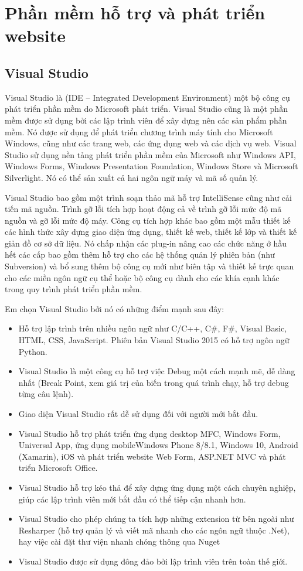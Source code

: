 \section{Phần mềm hỗ trợ và phát triển website}
\subsection{Visual Studio}
Visual Studio là (IDE – Integrated Development Environment) một bộ công cụ phát triển phần mềm do Microsoft phát triển. Visual Studio cũng là một phần mềm được sử dụng bởi các lập trình viên để xây dựng nên các sản phẩm phần mềm. Nó được sử dụng để phát triển chương trình máy tính cho Microsoft Windows, cũng như các trang web, các ứng dụng web và các dịch vụ web. Visual Studio sử dụng nền tảng phát triển phần mềm của Microsoft như Windows API, Windows Forms, Windows Presentation Foundation, Windows Store và Microsoft Silverlight. Nó có thể sản xuất cả hai ngôn ngữ máy và mã số quản lý.
\par
Visual Studio bao gồm một trình soạn thảo mã hỗ trợ IntelliSense cũng như cải tiến mã nguồn. Trình gỡ lỗi tích hợp hoạt động cả về trình gỡ lỗi mức độ mã nguồn và gỡ lỗi mức độ máy. Công cụ tích hợp khác bao gồm một mẫu thiết kế các hình thức xây dựng giao diện ứng dụng, thiết kế web, thiết kế lớp và thiết kế giản đồ cơ sở dữ liệu. Nó chấp nhận các plug-in nâng cao các chức năng ở hầu hết các cấp bao gồm thêm hỗ trợ cho các hệ thống quản lý phiên bản (như Subversion) và bổ sung thêm bộ công cụ mới như biên tập và thiết kế trực quan cho các miền ngôn ngữ cụ thể hoặc bộ công cụ dành cho các khía cạnh khác trong quy trình phát triển phần mềm.
\par
Em chọn Visual Studio bởi nó có những điểm mạnh sau đây:
\begin{itemize}
	\item Hỗ trợ lập trình trên nhiều ngôn ngữ như C/C++, C\#, F\#, Visual Basic, HTML, CSS, JavaScript. Phiên bản Visual Studio 2015 có hỗ trợ ngôn ngữ Python.
	\item Visual Studio là một công cụ hỗ trợ việc Debug một cách mạnh mẽ, dễ dàng nhất (Break Point, xem giá trị của biến trong quá trình chạy, hỗ trợ debug từng câu lệnh).
	\item Giao diện Visual Studio rất dễ sử dụng đối với người mới bắt đầu.
	\item Visual Studio hỗ trợ phát triển ứng dụng desktop MFC, Windows Form, Universal App, ứng dụng mobileWindows Phone 8/8.1, Windows 10, Android (Xamarin), iOS và phát triển  website Web Form, ASP.NET MVC và phát triển Microsoft Office.
	\item Visual Studio hỗ trợ kéo thả để xây dựng ứng dụng một cách chuyên nghiệp, giúp các lập trình viên mới bắt đầu có thể tiếp cận nhanh hơn.
	\item Visual Studio cho phép chúng ta tích hợp những extension từ bên ngoài như Resharper (hỗ trợ quản lý và viết mã nhanh cho các ngôn ngữ thuộc .Net), hay việc cài đặt thư viện nhanh chóng thông qua Nuget
	\item Visual Studio được sử dụng đông đảo bởi lập trình viên trên toàn thế giới.
\end{itemize}
